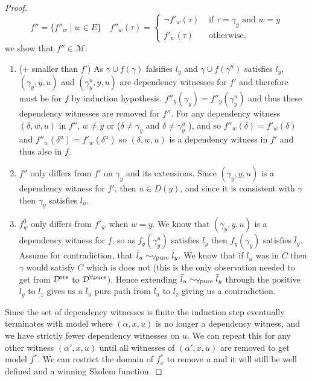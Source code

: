 \documentclass[runningheads]{llncs}
\newcommand{\mpool}{\mathcal{M}}
\newcommand{\pusim}{\ensuremath{\sim_{\mbox{\scriptsize \upshape $\forall$pure}}}}
\newcommand{\Dz}[1]{\ensuremath{\mathcal{D}^{\mbox{\scriptsize \upshape #1}}}\xspace}
\newcommand{\Drrs}{\Dz{rrs}}
\newcommand{\Dpu}{\Dz{$\forall$pure}}
\begin{document}
\begin{proof}
	 	
	 \[ f''=\{f''_w \mid w \in E \}\quad
	 	f''_w(\tau) = \begin{cases}
	 		\neg f'_w(\tau) & \text{ if } \tau = \gamma_y \text{ and } w=y\\
	 		f'_w (\tau)     & \text{ otherwise,}
	 	\end{cases}
	 	\]
	 we show that $f''\in\mpool$:
	 \begin{enumerate}
	 	\item (+ smaller than $f'$) As $\gamma \cup f(\gamma)$ falsifies $l_y$ and $\gamma \cup f(\gamma^u)$ satisfies $l_y$,	 	
	 	$(\gamma_y, y, u)$ and  $(\gamma^u_y, y, u)$ are dependency witnesses for $f'$ and therefore must be for $f$ by induction hypothesis. $f''_y(\gamma_y)=  f''_y(\gamma^u_y)$ and thus these dependency witnesses are removed for $f''$. 
	 	For any dependency witness $(\delta, w, u)$ in $f''$, $w\neq y$ or ($\delta\neq \gamma_y$ and $\delta\neq \gamma_y^u$ ), and so $f''_w(\delta)=f'_w(\delta)$ and $f''_w(\delta^u)=f'_w(\delta^u)$ so $(\delta, w, u)$ is a dependency witness in $f'$ and thus also in $f$. %
	 	\item $f''$ only differs from $f'$ on $\gamma_y$ and its extensions.
	 	Since $(\gamma_y, y,u)$ is a dependency witness for $f'$, then $u\in D(y)$, and since it is consistent with $\gamma$ then $\gamma_y$ satisfies $l_u$.
	 	\item $f_w^0$ only differs from $f'_w$ when $w=y$. 
	 	We know that $(\gamma_y, y,u)$ is a dependency witness for $f$, so as $f_y(\gamma^u_y)$ satisfies $l_y$ then $f_y(\gamma_y)$ satisfies $\bar l_y$. Assume for contradiction, that $\bar l_u  \pusim \bar l_y$. We know that if $l_u$ was in $C$ then $\gamma$ would satisfy $C$ which is does not (this is the only observation needed to get from \Drrs to \Dpu). Hence extending $\bar l_u  \pusim \bar l_y$ through the positive $l_y$ to $l_z$ gives us a $\bar l_u$ pure path from $\bar l_u$ to $l_z$ giving us a contradiction.
	 \end{enumerate}
	 
	 Since the set of dependency witnesses is finite the induction step eventually terminates with model where $(\alpha, x, u)$ is no longer a dependency witness, and we have strictly fewer dependency witnesses on $u$.
	 We can repeat this for any other witness $(\alpha', x, u)$ until all witnesses of $(\alpha', x, u)$ are removed to get model $f^*$. We can restrict the domain of $f^*_x$ to remove $u$ and it will still be well defined and a winning Skolem function.
		
	\end{proof}
		
\end{document}
